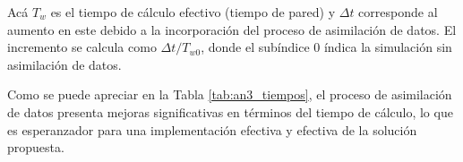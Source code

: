 Acá $T_w$ es el tiempo de cálculo efectivo (tiempo de pared) y $\Delta t$ corresponde al aumento en este debido a la incorporación del proceso de asimilación de datos. El incremento se calcula como $\Delta t/T_{w0}$, donde el subíndice 0 índica la simulación sin asimilación de datos.

Como se puede apreciar en la Tabla \ref{tab:an3_tiempos}, el proceso de asimilación de datos presenta mejoras significativas en términos del tiempo de cálculo, lo que es esperanzador para una implementación efectiva y efectiva de la solución propuesta. 

